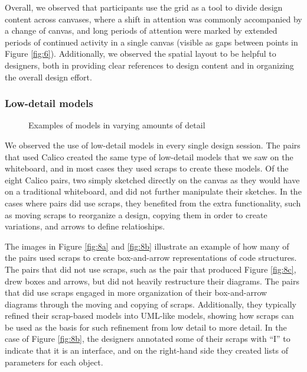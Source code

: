 Overall, we observed that participants use the grid as a tool to divide design content across canvases, where a shift in attention was commonly accompanied by a change of canvas, and long periods of attention were marked by extended periods of continued activity in a single canvas (visible as gaps between points in Figure \ref{fig:6}). Additionally, we observed the spatial layout to be helpful to designers, both in providing clear references to design content and in organizing the overall design effort.


\subsubsection {Low-detail models}
\label{results:22}

\begin{figure}%
  \centering
   \caption {Examples of models in varying amounts of detail}
   \label{fig:8}
\end{figure}%

We observed the use of low-detail models in every single design session. The pairs that used Calico created the same type of low-detail models that we saw on the whiteboard, and in most cases they used scraps to create these models. Of the eight Calico pairs, two simply sketched directly on the canvas as they would have on a traditional whiteboard, and did not further manipulate their sketches. In the cases where pairs did use scraps, they benefited from the extra functionality, such as moving scraps to reorganize a design, copying them in order to create variations, and arrows to define relatioships.

The images in Figure \ref{fig:8a} and \ref{fig:8b} illustrate an example of how many of the pairs used scraps to create box-and-arrow representations of code structures. The pairs that did not use scraps, such as the pair that produced Figure \ref{fig:8c}, drew boxes and arrows, but did not heavily restructure their diagrams. The pairs that did use scraps engaged in more organization of their box-and-arrow diagrams through the moving and copying of scraps. Additionally, they typically refined their scrap-based models into UML-like models, showing how scraps can be used as the basis for such refinement from low detail to more detail. In the case of Figure \ref{fig:8b}, the designers annotated some of their scraps with ``I'' to indicate that it is an interface, and on the right-hand side they created lists of parameters for each object.

